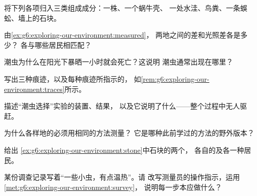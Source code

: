 \begin{exercise}[$\star$]\label{exo:g6:exploring-our-environment:3}
将下列各项归入三类组成成分：一株、一个蜗牛壳、
一处水洼、鸟粪、一条蜈蚣、墙上的石块。
\end{exercise}

\begin{exercise}[$\star$]\label{exo:g6:exploring-our-environment:4}
由\cref{ex:g6:exploring-our-environment:measured}，
两地之间的差和光照差各是多少？
各与哪些居民相匹配？
\end{exercise}

\begin{exercise}[$\star$]\label{exo:g6:exploring-our-environment:5}
潮虫为什么在阳光下暴晒一小时就会死亡？这说明
潮虫通常出现在哪里？
\end{exercise}

\begin{exercise}[$\star$]\label{exo:g6:exploring-our-environment:6}
写出三种痕迹，以及每种痕迹所指示的，
如\cref{rem:g6:exploring-our-environment:traces}所示。
\end{exercise}

\begin{exercise}[$\star\star$]\label{exo:g6:exploring-our-environment:7}
描述“潮虫选择”实验的装置、结果，
以及它说明了什么——整个过程中无人驱赶。
\end{exercise}

\begin{exercise}[$\star\star$]\label{exo:g6:exploring-our-environment:8}
为什么各样地的必须用相同的方法测量？
它是哪种此前学过的方法的野外版本？
\end{exercise}

\begin{exercise}[$\star\star$]\label{exo:g6:exploring-our-environment:9}
给出
\cref{ex:g6:exploring-our-environment:stone}中石块的两个，
各自的及各一种居民。
\end{exercise}

\begin{exercise}[$\star\star$]\label{exo:g6:exploring-our-environment:10}
某份调查记录写着“一些小虫，有点温热”。请
改写测量员的操作指示，运用
\cref{met:g6:exploring-our-environment:survey}，
说明每一步本应做什么？
\end{exercise}

